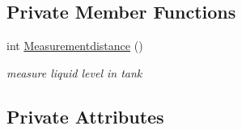 \subsection*{Private Member Functions}
\begin{DoxyCompactItemize}
\item 
int \hyperlink{class_measurement_a38d63e0d0d506ef409b4cf2e7fab8c8a}{Measurementdistance} ()
\begin{DoxyCompactList}\small\item\em measure liquid level in tank \end{DoxyCompactList}\end{DoxyCompactItemize}
\subsection*{Private Attributes}
